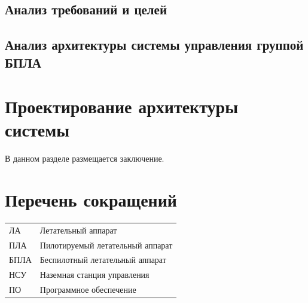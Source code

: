\documentclass[specification,annotation]{itmo-student-thesis}
\begin{document}
\section{Анализ требований и целей}\label{sec:analreqs}

\section{Анализ архитектуры системы управления группой БПЛА}\label{sec:analarch}

\chapter{Проектирование архитектуры системы}\label{ch:designarch}

\chapterconclusion

\startconclusionpage

В данном разделе размещается заключение.

\printmainbibliography

\appendix

\chapter{Перечень сокращений}\label{sec:app:1}

\begin{table}[!h]
  \centering
  \begin{tabularx}{\textwidth}{L{0.5} L{1.5}}
    \hline
    ЛА & Летательный аппарат \\
    ПЛА & Пилотируемый летательный аппарат \\
    БПЛА & Беспилотный летательный аппарат \\
    НСУ & Наземная станция управления \\
    ПО & Программное обеспечение \\
    \hline
  \end{tabularx}
\end{table}
\end{document}
